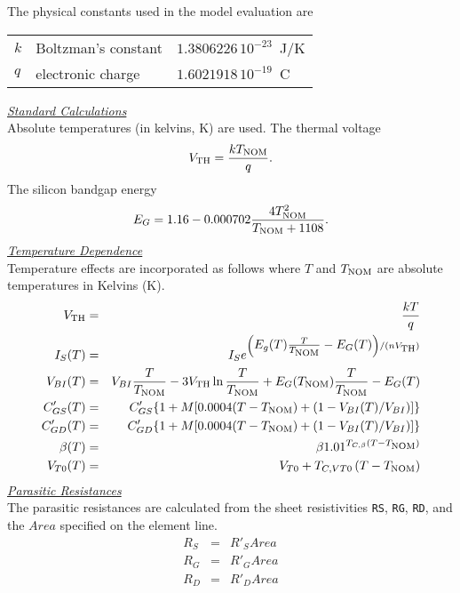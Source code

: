The physical constants used in the model evaluation are
\begin{center}
\begin{tabular}{|l|l|l|}
\hline
$k$ & Boltzman's constant           &  $1.3806226\,10^{-23}$~J/K\\
$q$ & electronic charge             & $1.6021918\,10^{-19}$~C\\
\hline
\end{tabular}
\end{center}
\noindent\underline{\sl \large Standard Calculations}\\[0.1in]
Absolute temperatures (in kelvins, K) are used.
The thermal voltage
\begin{equation}
V_{\mbox{\scriptsize TH}} = {{kT_{\mbox{\scriptsize NOM}}} \over q} .
\end{equation}
\noindent The silicon bandgap energy
\begin{equation}
E_G = 1.16 - 0.000702{{4T_{\mbox{\scriptsize NOM}}^2} \over {T_{\mbox{\scriptsize NOM}}+1108}} .
\end{equation}
\noindent\underline{\sl \large Temperature Dependence}
\\[0.1in]
Temperature effects are incorporated as follows where $T$ and $T_{\mbox{\scriptsize NOM}}$
are absolute temperatures in Kelvins (K).
\begin{eqnarray}
V_{\mbox{\scriptsize TH}} & = & {{kT} \over q}\\
I_S (T) & = & I_S e^{\left( \textstyle E_g(T) {T \over {T_{\mbox{\scriptsize NOM}}}}
 - E_G(T) \right) /(nV_{\mbox{\scriptsize TH}})}\\
V_{BI} (T) & = & V_{BI} {T \over {T_{\mbox{\scriptsize NOM}}}}
 - 3V_{\mbox{\scriptsize TH}} \ln{ {T \over {T_{\mbox{\scriptsize NOM}}}} }
              + E_G (T_{\mbox{\scriptsize NOM}}) {T \over {T_{\mbox{\scriptsize NOM}}}} -E_G(T)\\
C'_{GS} (T)&=&C'_{GS}\{1 + M [0.0004(T-T_{\mbox{\scriptsize NOM}})+(1-V_{BI} (T)/V_{BI})]\} \\
C'_{GD} (T)&=&C'_{GD}\{1 + M [0.0004(T-T_{\mbox{\scriptsize NOM}})+(1-V_{BI} (T)/V_{BI})]\} \\
\beta(T) &=& \beta 1.01^{T_{C,\beta}(T-T_{\mbox{\scriptsize NOM}})}\\
V_{T0}(T) &=& V_{T0} + T_{C,VT0}\left(T-T_{\mbox{\scriptsize NOM}}\right)
\end{eqnarray}
\noindent\underline{\sl \large Parasitic Resistances}\\[0.1in]
The parasitic resistances
are calculated from the sheet resistivities
{\tt RS}, {\tt RG}, {\tt RD}, and the
$Area$ specified on the element line.
\begin{eqnarray}
R_S & = & R'_S Area\\
R_G & = & R'_G Area\\
R_D & = & R'_D Area
\end{eqnarray}

